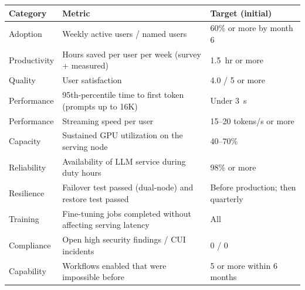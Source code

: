 
{\small
\begin{xltabular}{\textwidth}{@{}Y{0.724}Y{1.448}Y{0.828}@{}}
  \toprule
  Category & Metric & Target (initial) \\
  \midrule
  \endhead
  Adoption & Weekly active users / named users & 60\% or more by month 6 \\
  Productivity & Hours saved per user per week (survey + measured) & 1.5~hr or more \\
  Quality & User satisfaction & 4.0 / 5 or more \\
  Performance & 95th-percentile time to first token (prompts up to 16K) & Under 3~s \\
  Performance & Streaming speed per user & 15--20 tokens/s or more \\
  Capacity & Sustained GPU utilization on the serving node & 40--70\% \\
  Reliability & Availability of LLM service during duty hours & 98\% or more \\
  Resilience & Failover test passed (dual-node) and restore test passed & Before production; then quarterly \\
  Training & Fine-tuning jobs completed without affecting serving latency & All \\
  Compliance & Open high security findings / CUI incidents & 0 / 0 \\
  Capability & Workflows enabled that were impossible before & 5 or more within 6 months \\
  \bottomrule
\end{xltabular}}
